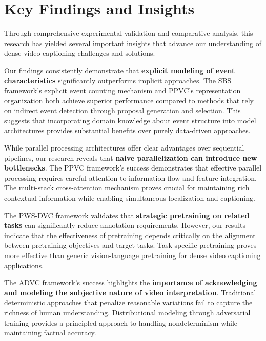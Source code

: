 \section{Key Findings and Insights}
\label{sec:key_findings}

Through comprehensive experimental validation and comparative analysis, this research has yielded several important insights that advance our understanding of dense video captioning challenges and solutions.

Our findings consistently demonstrate that \textbf{explicit modeling of event characteristics} significantly outperforms implicit approaches. The SBS framework's explicit event counting mechanism and PPVC's representation organization both achieve superior performance compared to methods that rely on indirect event detection through proposal generation and selection. This suggests that incorporating domain knowledge about event structure into model architectures provides substantial benefits over purely data-driven approaches.

While parallel processing architectures offer clear advantages over sequential pipelines, our research reveals that \textbf{naive parallelization can introduce new bottlenecks}. The PPVC framework's success demonstrates that effective parallel processing requires careful attention to information flow and feature integration. The multi-stack cross-attention mechanism proves crucial for maintaining rich contextual information while enabling simultaneous localization and captioning.

The PWS-DVC framework validates that \textbf{strategic pretraining on related tasks} can significantly reduce annotation requirements. However, our results indicate that the effectiveness of pretraining depends critically on the alignment between pretraining objectives and target tasks. Task-specific pretraining proves more effective than generic vision-language pretraining for dense video captioning applications.

The ADVC framework's success highlights the \textbf{importance of acknowledging and modeling the subjective nature of video interpretation}. Traditional deterministic approaches that penalize reasonable variations fail to capture the richness of human understanding. Distributional modeling through adversarial training provides a principled approach to handling nondeterminism while maintaining factual accuracy.


